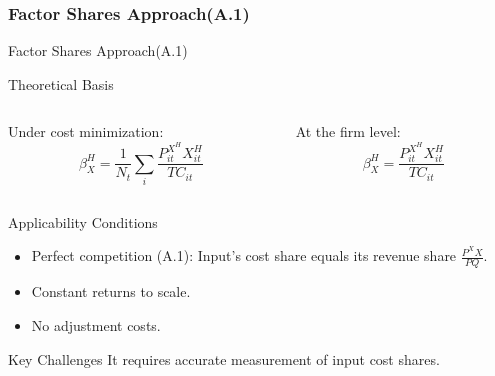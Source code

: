 \documentclass[aspectratio=169]{beamer}  %
\begin{document}
\subsubsection{Factor Shares Approach(A.1)}
\begin{frame}{Factor Shares Approach(A.1)}
    \begin{block}{Theoretical Basis}
        \begin{columns}[t] %
            \begin{column}{0.48\textwidth} %
                Under cost minimization:
                \[
                \beta^H_{X} = \frac{1}{N_{t}}\sum_i \frac{P^{X^{H}}_{it} X^H_{it}}{TC_{it}}
                \]
            \end{column}
            \begin{column}{0.48\textwidth} %
                At the firm level:
                \[
                \beta^H_{X} = \frac{P^{X^{H}}_{it} X^H_{it}}{TC_{it}}
                \]
            \end{column}
        \end{columns}
    \end{block}

    \begin{exampleblock}{Applicability Conditions}
        \begin{itemize}
            \item Perfect competition (A.1): Input's cost share equals its revenue share \(\frac{P^{X}X}{PQ}\).
            \item Constant returns to scale.
            \item No adjustment costs.
        \end{itemize}
    \end{exampleblock}

    \begin{alertblock}{Key Challenges}
        It requires accurate measurement of input cost shares.
    \end{alertblock}
\end{frame}
\end{document}

